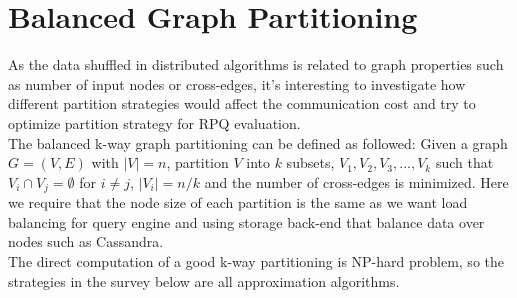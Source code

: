 \section{Balanced Graph Partitioning}
As the data shuffled in distributed algorithms is related to graph properties such as number of input nodes or cross-edges, it's interesting to investigate how different partition strategies would affect the communication cost and try to optimize partition strategy for RPQ evaluation.\\
The balanced k-way graph partitioning can be defined as followed\cite{karypis1998multilevelk}: Given a graph $G = (V,E)$ with $|V| = n$, partition $V$ into $k$ subsets, $V_1,V_2,V_3,...,V_k$ such that $V_i\cap V_j=\emptyset$ for $i\neq j$, $|V_i|=n/k$ and the number of cross-edges is minimized. Here we require that the node size of each partition is the same as we want load balancing for query engine and using storage back-end that balance data over nodes such as Cassandra.\\
The direct computation of a good k-way partitioning is NP-hard problem\cite{karypis1998multilevel}, so the strategies in the survey below are all approximation algorithms.
